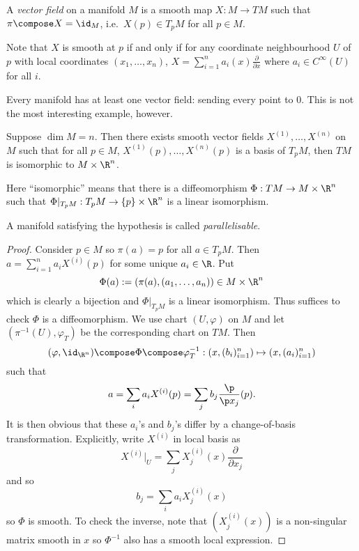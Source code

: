 \documentclass[a4paper]{article}
\begin{document}
\begin{definition}
  A \emph{vector field} on a manifold \(M\) is a smooth map \(X: M \to TM\) such that \(\pi \compose X = \id_M\), i.e.\ \(X(p) \in T_pM\) for all \(p \in M\).
\end{definition}

Note that \(X\) is smooth at \(p\) if and only if for any coordinate neighbourhood \(U\) of \(p\) with local coordinates \((x_1, \dots, x_n)\), \(X = \sum_{i = 1}^n a_i(x) \frac{\partial  }{\partial x}\) where \(a_i \in C^\infty(U)\) for all \(i\).

\begin{eg}
  Every manifold has at least one vector field: sending every point to \(0\). This is not the most interesting example, however.
\end{eg}

\begin{theorem}
  Suppose \(\dim M = n\). Then there exists smooth vector fields \(X^{(1)}, \dots, X^{(n)}\) on \(M\) such that for all \(p \in M\), \(X^{(1)}(p), \dots, X^{(n)}(p)\) is a basis of \(T_pM\), then \(TM\) is isomorphic to \(M \times \R^n\).
\end{theorem}

Here ``isomorphic'' means that there is a diffeomorphism \(\Phi: TM \to M \times \R^n\) such that \(\Phi|_{T_pM}: T_pM \to \{p\} \times \R^n\) is a linear isomorphism.

\begin{definition}[parallelisable]
  A manifold satisfying the hypothesis is called \emph{parallelisable}.
\end{definition}

\begin{proof}
  Consider \(p \in M\) so \(\pi(a) = p\) for all \(a \in T_pM\). Then \(a = \sum_{i = 1}^n a_iX^{(i)}(p)\) for some unique \(a_i \in \R\). Put
  \[
    \Phi(a) := (\pi(a), (a_1, \dots, a_n)) \in M \times \R^n
  \]
  which is clearly a bijection and \(\Phi|_{T_pM}\) is a linear isomorphism. Thus suffices to check \(\Phi\) is a diffeomorphism. We use chart \((U, \varphi)\) on \(M\) and let \((\pi^{-1}(U), \varphi_T)\) be the corresponding chart on \(TM\). Then
  \[
    (\varphi, \id_{\R^n}) \compose \Phi \compose \varphi_T^{-1}:
    (x, (b_i)_{i = 1}^n) \mapsto (x, (a_i)_{i = 1}^n)
  \]
  such that
  \[
    a = \sum_i a_i X^{(i)}(p) = \sum_j b_j \frac{\p}{\p x_j}(p).
  \]
  It is then obvious that these \(a_i\)'s and \(b_j\)'s differ by a change-of-basis transformation. Explicitly, write \(X^{(i)}\) in local basis as
  \[
    X^{(i)}|_U = \sum_j X_j^{(i)} (x) \frac{\partial  }{\partial x_j}
  \]
  and so
  \[
    b_j = \sum_i a_i X_j^{(i)}(x)
  \]
  so \(\Phi\) is smooth. To check the inverse, note that \((X_j^{(i)}(x))\) is a non-singular matrix smooth in \(x\) so \(\Phi^{-1}\) also has a smooth local expression.
\end{proof}
\end{document}
